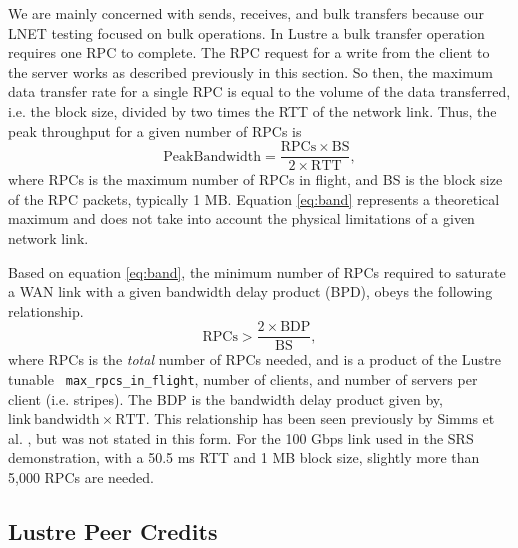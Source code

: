 \documentclass[]{sig-alternate}
\begin{document}
We are mainly concerned with sends, receives, and bulk transfers because our LNET testing focused on bulk
operations. In Lustre a bulk transfer operation requires one RPC to complete. The RPC request for a write
from the client to the server works as described previously in this section. So then, the maximum data
transfer rate for a single RPC is equal to the volume of the data transferred, i.e. the block size, divided by
two times the RTT of the network link. Thus, the peak throughput for a given number of RPCs is
\begin{equation}
\mathrm{Peak Bandwidth = \frac{RPCs \times BS}{2 \times RTT}},
\label{eq:band}
\end{equation}
where RPCs is the maximum number of RPCs in flight, and BS is the block size of the RPC packets, typically 1
MB. Equation \ref{eq:band} represents a theoretical maximum and does not take into account the physical
limitations of a given network link.

Based on equation \ref{eq:band}, the minimum number of RPCs required to saturate a WAN link with a given
bandwidth delay product (BPD), obeys the following relationship.
\begin{equation}
\mathrm{RPCs > \frac{2\times BDP}{BS},}
\label{eq:rpcs}
\end{equation}
where RPCs is the {\it total} number of RPCs needed, and is a product of the Lustre tunable {\tt
  max\_rpcs\_in\_flight}, number of clients, and number of servers per client (i.e. stripes). The BDP is the
bandwidth delay product given by, \linebreak $\mathrm{link~bandwidth \times RTT}$. This relationship has been seen
previously by Simms et al. \cite{simms2007}, but was not stated in this form. For the 100 Gbps link used in
the SRS demonstration, with a 50.5 ms RTT and 1 MB block size, slightly more than 5,000 RPCs are needed.

\subsection{Lustre Peer Credits}
\end{document}

